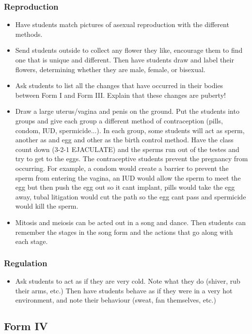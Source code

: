 \subsubsection{Reproduction}
\begin{itemize}
\item Have students match pictures of asexual reproduction with the different methods.
\item Send students outside to collect any flower they like, encourage them to find one that is unique and different. Then have students draw and label their flowers, determining whether they are male, female, or bisexual.
\item Ask students to list all the changes that have occurred in their bodies between Form I and Form III. Explain that these changes are puberty!
\item Draw a large uterus/vagina and penis on the ground. Put the students into groups and give each group a different method of contraception (pills, condom, IUD, spermicide...). In each group, some students will act as sperm, another as and egg and other as the birth control method. Have the class count down (3-2-1 EJACULATE) and the sperms run out of the testes and try to get to the eggs. The contraceptive students prevent the pregnancy from occurring. For example, a condom would create a barrier to prevent the sperm from entering the vagina, an IUD would allow the sperm to meet the egg but then push the egg out so it cant implant, pills would take the egg away, tubal litigation would cut the path so the egg cant pass and spermicide would kill the sperm.
\item Mitosis and meiosis can be acted out in a song and dance. Then students can remember the stages in the song form and the actions that go along with each stage.
\end{itemize}

\subsubsection{Regulation}
\begin{itemize}
\item Ask students to act as if they are very cold.  Note what they do (shiver, rub their arms, etc.) Then have students behave as if they were in a very hot environment, and note their behaviour (sweat, fan themselves, etc.) 
\end{itemize}

\subsection{Form IV}
